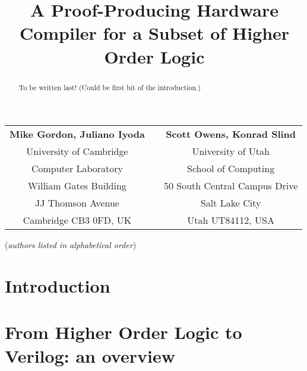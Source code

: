 \documentclass{llncs}
\title{A Proof-Producing Hardware Compiler for a Subset of Higher Order Logic}
\author{}
\institute{}
\begin{document}
\maketitle

\vspace*{-8mm}

\begin{center}
\begin{tabular}{ccc}
{\bf Mike Gordon, Juliano Iyoda} &\hspace*{5mm}& {\bf Scott Owens, Konrad Slind}\\
University of Cambridge          &\hspace*{5mm}& University of Utah\\
Computer Laboratory              &\hspace*{5mm}& School of Computing\\
William Gates Building           &\hspace*{5mm}& 50 South Central Campus Drive\\
JJ Thomson Avenue                &\hspace*{5mm}& Salt Lake City\\
Cambridge CB3 0FD, UK            &\hspace*{5mm}& Utah UT84112, USA
\end{tabular}


\vspace*{2mm}

({\it{authors listed in alphabetical order\/}})
\end{center}

\vspace*{-5mm}

\thispagestyle{empty}

\begin{abstract}
To be written last! (Could be first bit of the introduction.)
\end{abstract}

\section{Introduction}
\label{secIntroduction}



\section{From Higher Order Logic to Verilog: an overview}
\label{secHOL2Verilog}

\end{document}

